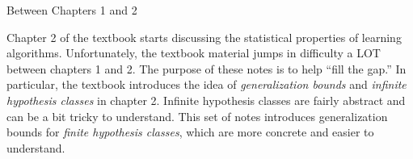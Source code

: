 \documentclass[10pt]{exam}
\theoremstyle{definition}
\begin{document}
\begin{center}
{
\Huge
Between Chapters 1 and 2
}
\end{center}

\begin{center}
\end{center}

\noindent
Chapter 2 of the textbook starts discussing the statistical properties of learning algorithms.
Unfortunately, the textbook material jumps in difficulty a LOT between chapters 1 and 2.
The purpose of these notes is to help ``fill the gap.''
In particular, the textbook introduces the idea of \emph{generalization bounds} and \emph{infinite hypothesis classes} in chapter 2.
Infinite hypothesis classes are fairly abstract and can be a bit tricky to understand.
This set of notes introduces generalization bounds for \emph{finite hypothesis classes},
which are more concrete and easier to understand.


\end{document}
